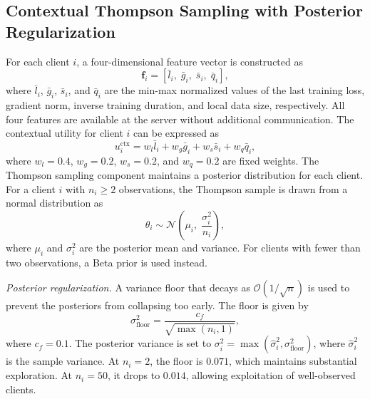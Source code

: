 \documentclass[journal]{IEEEtran}
\begin{document}
\subsection{Contextual Thompson Sampling with Posterior Regularization}

For each client $i$, a four-dimensional feature vector is constructed as
\begin{equation}
\bm{f}_i = \left[\bar{l}_i, \; \bar{g}_i, \; \bar{s}_i, \; \bar{q}_i\right],
\label{eq:features}
\end{equation}
where $\bar{l}_i$, $\bar{g}_i$, $\bar{s}_i$, and $\bar{q}_i$ are the min-max normalized values of the last training loss, gradient norm, inverse training duration, and local data size, respectively. All four features are available at the server without additional communication. The contextual utility for client $i$ can be expressed as
\begin{equation}
u_i^{\text{ctx}} = w_l \bar{l}_i + w_g \bar{g}_i + w_s \bar{s}_i + w_q \bar{q}_i,
\label{eq:ctx_utility}
\end{equation}
where $w_l = 0.4$, $w_g = 0.2$, $w_s = 0.2$, and $w_q = 0.2$ are fixed weights. The Thompson sampling component maintains a posterior distribution for each client. For a client $i$ with $n_i \geq 2$ observations, the Thompson sample is drawn from a normal distribution as
\begin{equation}
\theta_i \sim \mathcal{N}\!\left(\mu_i, \; \frac{\sigma^2_i}{n_i}\right),
\label{eq:ts_sample}
\end{equation}
where $\mu_i$ and $\sigma^2_i$ are the posterior mean and variance. For clients with fewer than two observations, a Beta prior is used instead.

\textit{Posterior regularization.} A variance floor that decays as $\mathcal{O}(1/\sqrt{n})$ is used to prevent the posteriors from collapsing too early. The floor is given by
\begin{equation}
\sigma^2_{\text{floor}} = \frac{c_f}{\sqrt{\max(n_i, 1)}},
\label{eq:var_floor}
\end{equation}
where $c_f = 0.1$. The posterior variance is set to $\sigma^2_i = \max(\hat{\sigma}^2_i, \sigma^2_{\text{floor}})$, where $\hat{\sigma}^2_i$ is the sample variance. At $n_i = 2$, the floor is $0.071$, which maintains substantial exploration. At $n_i = 50$, it drops to $0.014$, allowing exploitation of well-observed clients.
\end{document}
